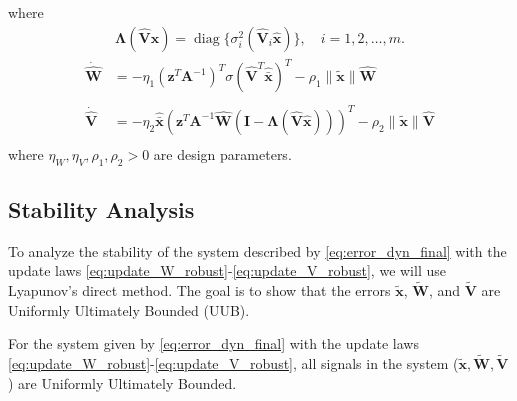 \documentclass[10pt,twocolumn]{ICCAS}
\newcommand{\xtilde}{\tilde{\bm{x}}}
\newcommand{\xhatbar}{\hat{\bar{\bm{x}}}}
\newcommand{\Wtilde}{\tilde{\mathbf{W}}}
\newcommand{\What}{\hat{\mathbf{W}}}
\newcommand{\Vtilde}{\tilde{\mathbf{V}}}
\newcommand{\Vhat}{\hat{\mathbf{V}}}
\newcommand{\diag}{\operatorname{diag}}
\begin{document}
where
\begin{align}
    \mathbf{\Lambda}(\hat{\mathbf{V}}\hat{\bm{x}}) = \diag\{\sigma_i^2(\hat{\mathbf{V}}_i\hat{\bm{x}})\}, \quad i=1,2,\dots,m.
\end{align}
\begin{align}
    \dot{\What} &= -\eta_1 \left(\bm{z}^{T} \bm{A}^{-1}  \right)^{T} \sigma(\Vhat^T\xhatbar)^T - \rho_1 \|\xtilde\| \What\\\label{eq:update_W_robust}\\
    \dot{\Vhat} &= -\eta_2 \xhatbar \left( \bm{z}^T \bm{A}^{-1} \What (\mathbf{I} - \mathbf{\Lambda}({\mathbf{\hat{V}}}{\bm{\hat{x}}})) \right)^T - \rho_2 \|\xtilde\| \Vhat \\\label{eq:update_V_robust}
\end{align}
where $\eta_W, \eta_V, \rho_1, \rho_2 > 0$ are design parameters.\\ 

\subsection{Stability Analysis}

To analyze the stability of the system described by \eqref{eq:error_dyn_final} with the update laws \eqref{eq:update_W_robust}-\eqref{eq:update_V_robust}, we will use Lyapunov's direct method. The goal is to show that the errors $\xtilde$, $\Wtilde$, and $\Vtilde$ are Uniformly Ultimately Bounded (UUB).

\begin{theorem}
For the system given by \eqref{eq:error_dyn_final} with the update laws \eqref{eq:update_W_robust}-\eqref{eq:update_V_robust}, all signals in the system ($\xtilde, \Wtilde, \Vtilde$) are Uniformly Ultimately Bounded.
\end{theorem}
\end{document}
